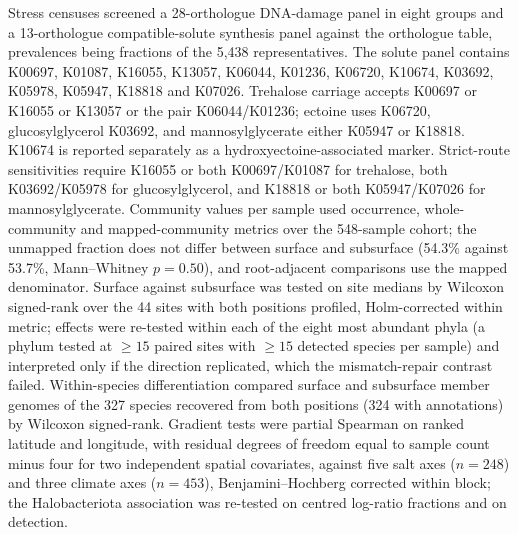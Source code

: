 \documentclass[11pt]{article}
\begin{document}
Stress censuses screened a 28-orthologue DNA-damage panel in eight groups and a 13-orthologue
compatible-solute synthesis panel against the
orthologue table, prevalences being fractions of the 5{,}438 representatives. The solute panel contains K00697, K01087, K16055, K13057, K06044, K01236, K06720, K10674, K03692, K05978, K05947, K18818 and K07026. Trehalose carriage accepts K00697 or K16055 or K13057 or the pair K06044/K01236; ectoine uses K06720, glucosylglycerol K03692, and mannosylglycerate either K05947 or K18818. K10674 is reported separately as a hydroxyectoine-associated marker. Strict-route sensitivities require K16055 or both K00697/K01087 for trehalose, both K03692/K05978 for glucosylglycerol, and K18818 or both K05947/K07026 for mannosylglycerate. Community values per
sample used occurrence, whole-community and mapped-community metrics over the 548-sample cohort;
the unmapped fraction does not differ between surface and subsurface (54.3\% against 53.7\%,
Mann--Whitney $p = 0.50$), and root-adjacent comparisons use the mapped denominator. Surface against
subsurface was tested on site medians by Wilcoxon signed-rank over the 44 sites with both positions
profiled, Holm-corrected within metric; effects were re-tested within each of the eight most
abundant phyla (a phylum tested at $\geq 15$ paired sites with $\geq 15$ detected species per
sample) and interpreted only if the direction replicated, which the mismatch-repair contrast failed.
Within-species differentiation compared surface and subsurface member genomes of the 327 species
recovered from both positions (324 with annotations) by Wilcoxon signed-rank. Gradient tests were
partial Spearman on ranked latitude and longitude, with residual degrees of freedom equal to sample count minus four for two independent spatial covariates, against five salt axes ($n = 248$) and three
climate axes ($n = 453$), Benjamini--Hochberg corrected within block; the Halobacteriota association
was re-tested on centred log-ratio fractions and on detection.
\end{document}
